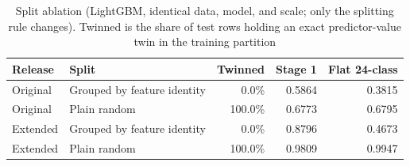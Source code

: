 \begin{table}[!t]
\caption{Split ablation (LightGBM, identical data, model, and scale; only the
splitting rule changes). Twinned is the share of test rows holding an exact
predictor-value twin in the training partition}
\label{tab:split_ablation}
\centering
\small
\begin{tabular}{llrrr}
\toprule
Release & Split & Twinned & Stage 1 & Flat 24-class \\
\midrule
Original & Grouped by feature identity & 0.0\% & 0.5864 & 0.3815 \\
Original & Plain random & 100.0\% & 0.6773 & 0.6795 \\
Extended & Grouped by feature identity & 0.0\% & 0.8796 & 0.4673 \\
Extended & Plain random & 100.0\% & 0.9809 & 0.9947 \\
\bottomrule
\end{tabular}
\end{table}
